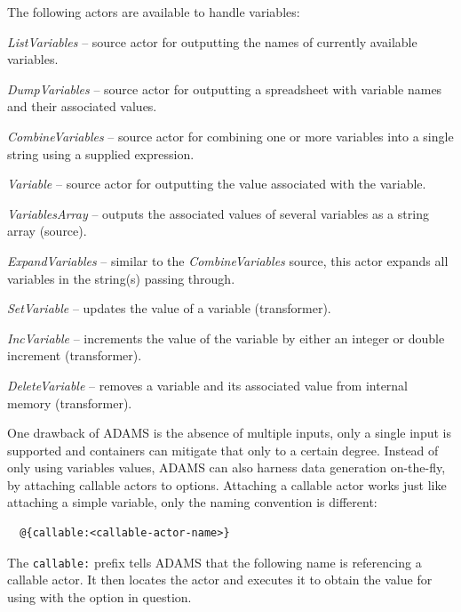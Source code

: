 The following actors are available to handle variables:
\begin{tight_itemize}
	\item \textit{ListVariables} -- source actor for outputting the names of 
	currently available variables.
	\item \textit{DumpVariables} -- source actor for outputting a spreadsheet with
	variable names and their associated values.
	\item \textit{CombineVariables} -- source actor for combining one or more
	variables into a single string using a supplied expression.
	\item \textit{Variable} -- source actor for outputting the value associated
	with the variable.
	\item \textit{VariablesArray} -- outputs the associated values of several
	variables as a string array (source).
	\item \textit{ExpandVariables} -- similar to the \textit{CombineVariables}
	source, this actor expands all variables in the string(s) passing through.
	\item \textit{SetVariable} -- updates the value of a variable (transformer).
	\item \textit{IncVariable} -- increments the value of the variable by either an
	integer or double increment (transformer).
	\item \textit{DeleteVariable} -- removes a variable and its associated value
	from internal memory (transformer).
\end{tight_itemize}

One drawback of ADAMS is the absence of multiple inputs, only a single input is
supported and containers can mitigate that only to a certain degree. Instead of
only using variables values, ADAMS can also harness data generation on-the-fly,
by attaching callable actors to options. Attaching a callable actor works just like
attaching a simple variable, only the naming convention is different:
\begin{verbatim}
  @{callable:<callable-actor-name>}
\end{verbatim}
The \texttt{callable:} prefix tells ADAMS that the following name is referencing a
callable actor. It then locates the actor and executes it to obtain the value for
using with the option in question.

